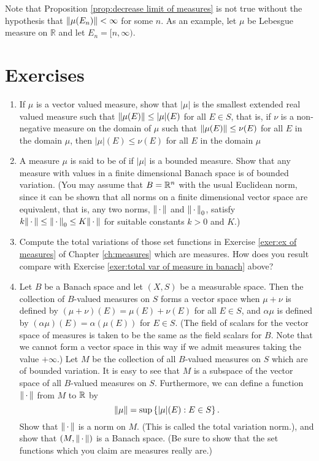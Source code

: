 Note that Proposition \ref{prop:decrease limit of measures} is not true without the hypothesis that $\norm{\mu(E_n)}<\infty$ for some $n$. As an example, let $\mu$ be Lebesgue measure on $\mathbb{R}$ and let $E_n=[n, \infty)$. 

\section{Exercises}
\begin{enumerate}[label=\arabic*),ref=\arabic*]
\item
\label{exer:total var smallest}
If $\mu$ is a vector valued measure, show that $|\mu|$ is the smallest extended real valued measure such that $\norm{\mu(E)}\leq|\mu|(E)$ for all $E \in S$, that is, if $\nu$ is a non-negative measure on the domain of $\mu$ such that $\norm{\mu(E)}\leq\nu(E)$ for all $E$ in the domain $\mu$, then $|\mu|(E)\leq\nu(E)$ for all $E$ in the domain $\mu$

\item \label{exer:total var of measure in banach}
A measure $\mu$ is said to be of  if $|\mu|$ is a bounded measure. Show that any measure with values in a finite dimensional Banach space is of bounded variation. (You may assume that $B=\mathbb{R}^n$ with the usual Euclidean norm, since it can be shown that all norms on a finite dimensional vector space are equivalent, that is, any two norms, $\norm{\,\cdot\,}$ and $\norm{\,\cdot\,}_0$, satisfy $k\norm{\,\cdot\,}\leq\norm{\,\cdot\,}_0\leq K\norm{\,\cdot\,}$ for suitable constants $k>0$ and $K$.)

\item Compute the total variations of those set functions in Exercise \ref{exer:ex of measures} of Chapter \ref{ch:measures} which are measures. How does you result compare with Exercise \ref{exer:total var of measure in banach} above?

\item Let $B$ be a Banach space and let $(X, S)$ be a measurable space. Then the collection of $B$-valued measures on $S$ forms a vector space when $\mu+\nu$ is defined by $(\mu+\nu)(E)=\mu(E)+\nu(E)$ for all $E \in S$, and $\alpha\mu$ is defined by $(\alpha \mu)(E)=\alpha(\mu(E))$ for $E \in S$. (The field of scalars for the vector space of measures is taken to be the same as the field scalars for $B$. Note that we cannot form a vector space in this way if we admit measures taking the value $+\infty$.) Let $M$ be the collection of all $B$-valued measures on $S$ which are of bounded variation. It is easy to see that $M$ is a subspace of the vector space of all $B$-valued measures on $S$. Furthermore, we can define a function $\norm{\,\cdot\,}$ from $M$ to $\mathbb{R}$ by $$\norm{\mu}=\sup\left\{|\mu|(E):E\in S\right\}.$$ Show that $\norm{\,\cdot\,}$ is a norm on $M$. (This is called the total variation norm.), and show that $(M,\norm{\,\cdot\,})$ is a Banach space. (Be sure to show that the set functions which you claim are measures really are.)


\end{enumerate}
